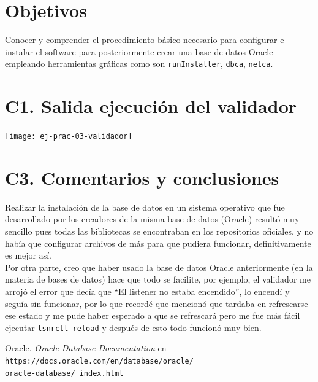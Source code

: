 \documentclass{article}
\begin{document}

\section*{Objetivos}
Conocer y comprender el procedimiento básico necesario para configurar e 
instalar el software para posteriormente crear una base de datos Oracle
empleando herramientas gráficas como son \texttt{runInstaller}, 
\texttt{dbca}, \texttt{netca}.


\section*{C1. Salida ejecución del validador}

\begin{center}
    \texttt{[image: ej-prac-03-validador]}    
\end{center}

\newpage
\section*{C3. Comentarios y conclusiones}
Realizar la instalación de la base de datos en un sistema operativo que fue 
desarrollado por los creadores de la misma base de datos (Oracle) resultó muy 
sencillo pues todas las bibliotecas se encontraban en los repositorios 
oficiales, y no había que configurar archivos de más para que pudiera funcionar,
definitivamente es mejor así.\\ 

Por otra parte, creo que haber usado la base de datos Oracle anteriormente
(en la materia de bases de datos) hace que todo se facilite, por ejemplo,
el validador me arrojó el error que decía que ``El listener no estaba 
encendido'', lo encendí y seguía sin funcionar, por lo que recordé que mencionó 
que tardaba en refrescarse ese estado y me pude haber esperado a que se 
refrescará pero me fue más fácil ejecutar \texttt{lsnrctl reload} y después de 
esto todo funcionó muy bien.

\renewcommand\refname{Bibliografía}
\begin{thebibliography}{99}
     Oracle. \textit{Oracle Database Documentation} en 
        \texttt{https://docs.oracle.com/en/database/oracle/\\oracle-database/
        index.html}
\end{thebibliography}
\end{document}
